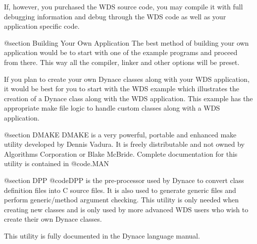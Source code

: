 If, however, you purchased the WDS source code, you may compile it
with full debugging information and debug through the WDS code
as well as your application specific code.


@section Building Your Own Application
The best method of building your own application would be to start
with one of the example programs and proceed from there.  This way
all the compiler, linker and other options will be preset.  

If you plan to create your own Dynace classes along with your WDS
application, it would be best for you to start with the WDS example
which illustrates the creation of a Dynace class along with the WDS
application.  This example has the appropriate make file logic to
handle custom classes along with a WDS application.

@section DMAKE
DMAKE is a very powerful, portable and enhanced make utility developed
by Dennis Vadura.  It is freely distributable and not owned by
Algorithms Corporation or Blake McBride.  Complete documentation for this utility
is contained in @code{\DYNACE\DOCS\DMAKE.MAN}

@section DPP
@code{DPP} is the pre-processor used by Dynace to convert class definition
files into C source files.  It is also used to generate generic files
and perform generic/method argument checking.  This utility is only needed
when creating new classes and is only used by more advanced WDS users
who wish to create their own Dynace classes.

This utility is fully documented in the Dynace language manual.



